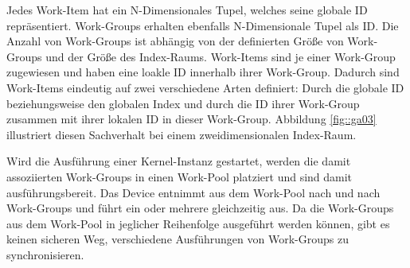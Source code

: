 Jedes Work-Item hat ein N-Dimensionales Tupel, welches seine globale ID repräsentiert.
Work-Groups erhalten ebenfalls N-Dimensionale Tupel als ID.
Die Anzahl von Work-Groups ist abhängig von der definierten Größe von Work-Groups und der Größe des Index-Raums.
Work-Items sind je einer Work-Group zugewiesen und haben eine loakle ID innerhalb ihrer Work-Group.
Dadurch sind Work-Items eindeutig auf zwei verschiedene Arten definiert: Durch die globale ID beziehungsweise den globalen Index und durch die ID ihrer Work-Group zusammen mit ihrer lokalen ID in dieser Work-Group.
Abbildung \ref{fig::ga03} illustriert diesen Sachverhalt bei einem zweidimensionalen Index-Raum.

Wird die Ausführung einer Kernel-Instanz gestartet, werden die damit assoziierten Work-Groups in einen Work-Pool platziert und sind damit ausführungsbereit.
Das Device entnimmt aus dem Work-Pool nach und nach Work-Groups und führt ein oder mehrere gleichzeitig aus.
Da die Work-Groups aus dem Work-Pool in jeglicher Reihenfolge ausgeführt werden können, gibt es keinen sicheren Weg, verschiedene Ausführungen von Work-Groups zu synchronisieren.

